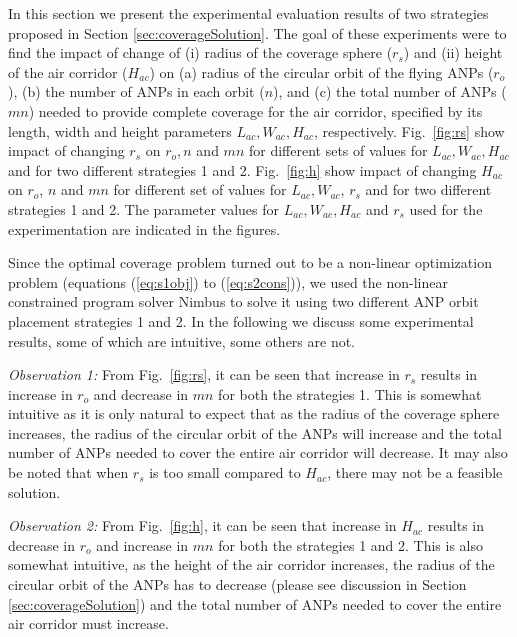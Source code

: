 \documentclass[10pt]{IEEEtran}
\begin{document}
In this section we present the experimental evaluation results of two strategies proposed in Section \ref{sec:coverageSolution}.  The goal of these experiments were to find the impact of change of (i) radius of the coverage sphere ($r_s$) and (ii) height of the air corridor ($H_{ac}$) on (a) radius  of the circular orbit of the flying ANPs ($r_o$), (b) the number of ANPs in each orbit ($n$), and (c) the total number of ANPs ($mn$) needed to provide complete coverage for the air corridor, specified by its length, width and height parameters $L_{ac}, W_{ac}, H_{ac}$, respectively.  Fig.~\ref{fig:rs} show impact of changing $r_s$ on $r_o, n$ and $mn$ for different sets of values for $L_{ac}, W_{ac}, H_{ac}$ and for two different strategies 1 and 2. Fig.~\ref{fig:h} show impact of changing $H_{ac}$ on $r_o$, $n$ and $mn$ for different set of values for $L_{ac}, W_{ac}$, $r_s$ and for two different strategies 1 and 2. The parameter values for $L_{ac}, W_{ac}, H_{ac}$ and $r_s$ used for the experimentation are indicated in the figures.

Since the optimal coverage problem turned out to be a non-linear optimization problem (equations (\ref{eq:s1obj}) to (\ref{eq:s2cons})), we used the non-linear constrained program solver Nimbus \cite{nimbus} to solve it using two different ANP orbit placement strategies 1 and 2. In the following we discuss some experimental results, some of which are intuitive, some others are not.

\medskip
\noindent
{\em Observation 1: }From Fig.~\ref{fig:rs}, it can be seen that increase in $r_s$ results in increase in $r_o$ and decrease in $mn$ for both the strategies 1. This is somewhat intuitive as it is only natural to expect that as the radius of the coverage sphere increases, the radius of the circular orbit of the ANPs will increase and the total number of ANPs needed to cover the entire air corridor will decrease. It may also be noted that when $r_s$ is too small compared to $H_{ac}$, there may not be a feasible solution.
    
\medskip
\noindent
{\em Observation 2: }From Fig.~\ref{fig:h}, it can be seen that increase in $H_{ac}$ results in decrease in $r_o$ and increase in $mn$ for both the strategies 1 and 2. This is also somewhat intuitive,  as the height of the air corridor increases, the radius of the circular orbit of the ANPs has to decrease (please see discussion in Section \ref{sec:coverageSolution}) and the total number of ANPs needed to cover the entire air corridor must increase. 
\end{document}
